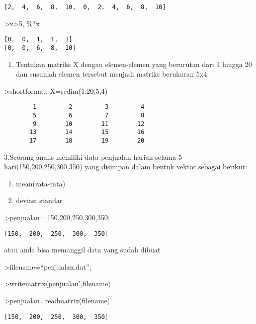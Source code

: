 \documentclass[
]{book}
\providecommand{\tightlist}{%
  \setlength{\itemsep}{0pt}\setlength{\parskip}{0pt}}
\begin{document}
\begin{verbatim}
[2,  4,  6,  8,  10,  0,  2,  4,  6,  8,  10]
\end{verbatim}

\textgreater x\textgreater5, \%*x

\begin{verbatim}
[0,  0,  1,  1,  1]
[0,  0,  6,  8,  10]
\end{verbatim}

\begin{enumerate}
\def\labelenumi{\arabic{enumi}.}
\setcounter{enumi}{1}
\tightlist
\item
  Tentukan matriks X dengan elemen-elemen yang berurutan dari 1 hingga 20 dan susunlah elemen tersebut menjadi matriks berukuran 5x4.
\end{enumerate}

\textgreater shortformat; X=redim(1:20,5,4)

\begin{verbatim}
        1         2         3         4 
        5         6         7         8 
        9        10        11        12 
       13        14        15        16 
       17        18        19        20 
\end{verbatim}

3.Seorang analis memiliki data penjualan harian selama 5 hari(150,200,250,300,350) yang disimpan dalam bentuk vektor sebagai berikut:

\begin{enumerate}
\def\labelenumi{\alph{enumi}.}
\item
  mean(rata-rata)
\item
  deviasi standar
\end{enumerate}

\textgreater penjualan={[}150,200,250,300,350{]}

\begin{verbatim}
[150,  200,  250,  300,  350]
\end{verbatim}

atau anda bisa memanggil data yang sudah dibuat

\textgreater filename=``penjualan.dat'';

\textgreater writematrix(penjualan',filename)

\textgreater penjualan=readmatrix(filename)'

\begin{verbatim}
[150,  200,  250,  300,  350]
\end{verbatim}
\end{document}
